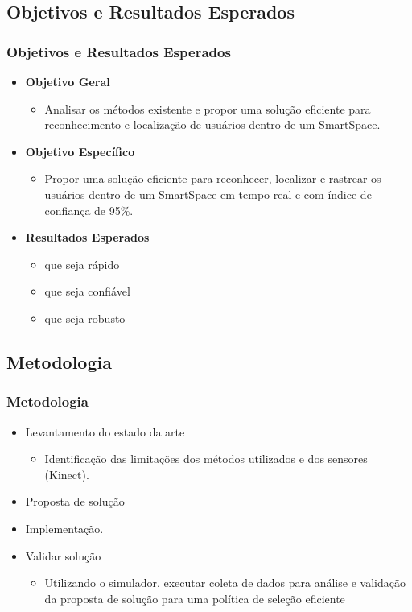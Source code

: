 \documentclass{beamer}
\begin{document}
\subsection{Objetivos e Resultados Esperados}
\begin{frame}
    \frametitle{Objetivos e Resultados Esperados}
    \begin{itemize}
      \item \textbf{Objetivo Geral}
        \begin{itemize}
          \item Analisar os métodos existente e propor uma solução eficiente para reconhecimento e localização de usuários dentro de um SmartSpace.
        \end{itemize}
      \item \textbf{Objetivo Específico}
        \begin{itemize}
          \item Propor uma solução eficiente para reconhecer, localizar e rastrear os usuários dentro de um SmartSpace em tempo real e com índice de confiança de 95\%.
        \end{itemize}
      \item \textbf{Resultados Esperados}
        \begin{itemize}
          \item que seja rápido
          \item que seja confiável
          \item que seja robusto
        \end{itemize}
    \end{itemize}
\end{frame}


\subsection{Metodologia}
\begin{frame}
    \frametitle{Metodologia}
    \begin{itemize}
    \pause \item Levantamento do estado da arte
        \begin{itemize}
            \item Identificação das limitações dos métodos utilizados e dos sensores (Kinect).
        \end{itemize}
    \pause \item Proposta de solução
    \pause \item Implementação.
    \pause \item Validar solução
        \begin{itemize}
            \item Utilizando o simulador, executar coleta de dados para análise
                e validação da proposta de solução para uma política de seleção
        eficiente
        \end{itemize}
    \end{itemize}
\end{frame}
\end{document}
